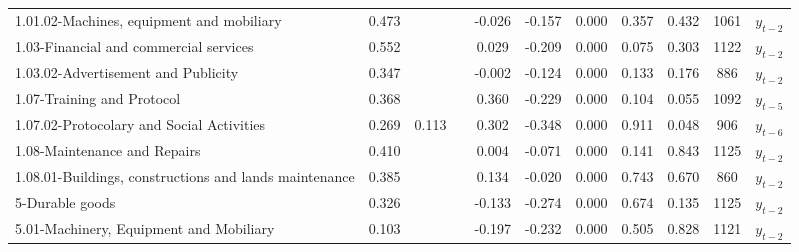 \begin{table}[ht]
\begin{center}
{\begin{tabular}{lcccccccccc}
\hspace{4mm}1.01.02-Machines, equipment and mobiliary              & 0.473\sym{***}  &           &           & -0.026          & -0.157              & 0.000 & 0.357 & 0.432              & 1061 & $y_{t-2}$   \\
\hspace{2mm}1.03-Financial and commercial services                 & 0.552\sym{***}  &           &           & 0.029           & -0.209\sym{***}           & 0.000 & 0.075 & 0.303              & 1122 & $y_{t-2}$   \\
\hspace{4mm}1.03.02-Advertisement and Publicity                    & 0.347\sym{***}  &           &           & -0.002          & -0.124              & 0.000 & 0.133 & 0.176              & 886  & $y_{t-2}$   \\
\hspace{2mm}1.07-Training and Protocol                             & 0.368\sym{***}  &           &           & 0.360\sym{***}        & -0.229\sym{***}           & 0.000 & 0.104 & 0.055              & 1092 & $y_{t-5}$   \\
\hspace{4mm}1.07.02-Protocolary and Social Activities              & 0.269\sym{**}   & 0.113\sym{**}    &           & 0.302\sym{***}        & -0.348\sym{***}           & 0.000 & 0.911 & 0.048              & 906  & $y_{t-6}$   \\
\hspace{2mm}1.08-Maintenance and Repairs                           & 0.410\sym{***}  &           &           & 0.004           & -0.071              & 0.000 & 0.141 & 0.843              & 1125 & $y_{t-2}$   \\
\hspace{4mm}1.08.01-Buildings, constructions and lands maintenance & 0.385\sym{***}  &           &           & 0.134           & -0.020              & 0.000 & 0.743 & 0.670              & 860  & $y_{t-2}$   \\
5-Durable goods                                                                     & 0.326\sym{***}  &           &           & -0.133          & -0.274\sym{**}            & 0.000 & 0.674 & 0.135              & 1125 & $y_{t-2}$   \\
\hspace{2mm}5.01-Machinery, Equipment and Mobiliary                & 0.103\sym{**}   &           &           & -0.197          & -0.232\sym{**}            & 0.000 & 0.505 & 0.828              & 1121 & $y_{t-2}$   \\

\end{tabular}}
\end{center}
\end{table}
